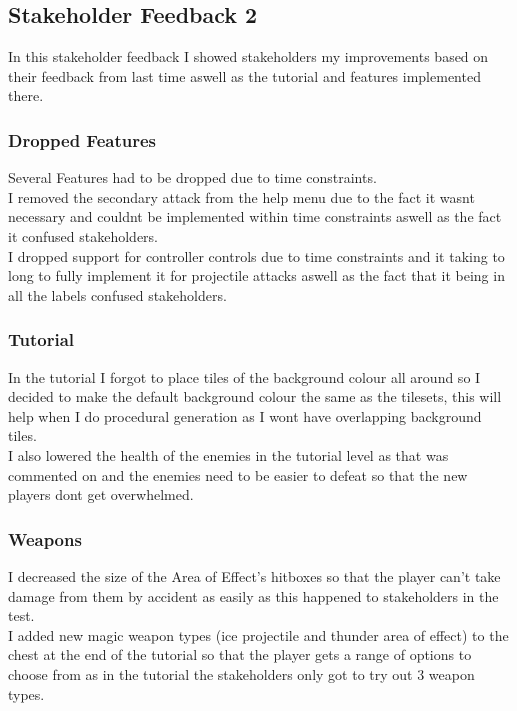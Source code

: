 \documentclass{article}
\begin{document}
        \subsection{Stakeholder Feedback 2}
        In this stakeholder feedback I showed stakeholders my improvements based on their feedback from last time aswell as the tutorial and features implemented there.\\
        \subsubsection{Dropped Features}
        Several Features had to be dropped due to time constraints.\\
        I removed the secondary attack from the help menu due to the fact it wasnt necessary and couldnt be implemented within time constraints aswell as the fact it confused stakeholders.\\
        I dropped support for controller controls due to time constraints and it taking to long to fully implement it for projectile attacks aswell as the fact that it being in all the labels confused stakeholders.\\
        \subsubsection{Tutorial}
        In the tutorial I forgot to place tiles of the background colour all around so I decided to make the default background colour the same as the tilesets, this will help when I do procedural generation as I wont have overlapping background tiles.\\
        I also lowered the health of the enemies in the tutorial level as that was commented on and the enemies need to be easier to defeat so that the new players dont get overwhelmed.\\
        \subsubsection{Weapons}
        I decreased the size of the Area of Effect's hitboxes so that the player can't take damage from them by accident as easily as this happened to stakeholders in the test.\\
        I added new magic weapon types (ice projectile and thunder area of effect) to the chest at the end of the tutorial so that the player gets a range of options to choose from as in the tutorial the stakeholders only got to try out 3 weapon types.\\
\end{document}

